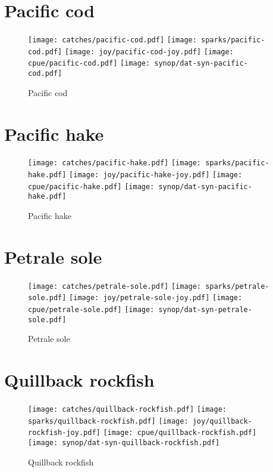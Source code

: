 \section*{Pacific cod}

\begin{figure}[htbp]
\centering
\texttt{[image: catches/pacific-cod.pdf]}
\texttt{[image: sparks/pacific-cod.pdf]}
\texttt{[image: joy/pacific-cod-joy.pdf]}
\texttt{[image: cpue/pacific-cod.pdf]}
\texttt{[image: synop/dat-syn-pacific-cod.pdf]}
\caption{Pacific cod}
\end{figure}
\clearpage
\section*{Pacific hake}

\begin{figure}[htbp]
\centering
\texttt{[image: catches/pacific-hake.pdf]}
\texttt{[image: sparks/pacific-hake.pdf]}
\texttt{[image: joy/pacific-hake-joy.pdf]}
\texttt{[image: cpue/pacific-hake.pdf]}
\texttt{[image: synop/dat-syn-pacific-hake.pdf]}
\caption{Pacific hake}
\end{figure}
\clearpage
\section*{Petrale sole}

\begin{figure}[htbp]
\centering
\texttt{[image: catches/petrale-sole.pdf]}
\texttt{[image: sparks/petrale-sole.pdf]}
\texttt{[image: joy/petrale-sole-joy.pdf]}
\texttt{[image: cpue/petrale-sole.pdf]}
\texttt{[image: synop/dat-syn-petrale-sole.pdf]}
\caption{Petrale sole}
\end{figure}
\clearpage
\section*{Quillback rockfish}

\begin{figure}[htbp]
\centering
\texttt{[image: catches/quillback-rockfish.pdf]}
\texttt{[image: sparks/quillback-rockfish.pdf]}
\texttt{[image: joy/quillback-rockfish-joy.pdf]}
\texttt{[image: cpue/quillback-rockfish.pdf]}
\texttt{[image: synop/dat-syn-quillback-rockfish.pdf]}
\caption{Quillback rockfish}
\end{figure}
\clearpage
